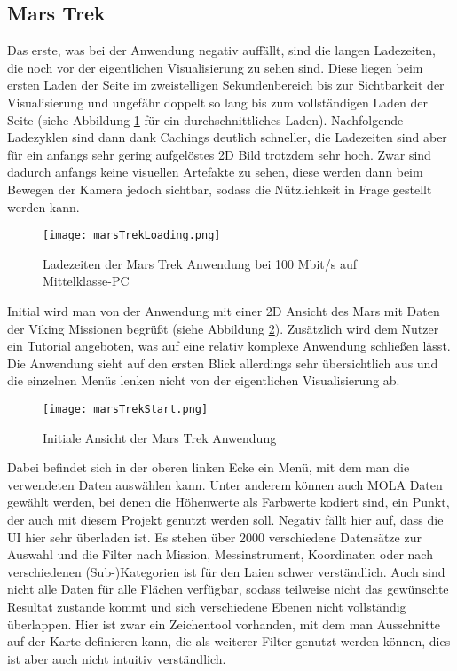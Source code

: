 \subsection{Mars Trek}\label{marsTrek}
Das erste, was bei der Anwendung negativ auffällt, sind die langen Ladezeiten, die noch vor der eigentlichen Visualisierung zu sehen sind. Diese liegen beim ersten Laden der Seite im zweistelligen Sekundenbereich bis zur Sichtbarkeit der Visualisierung und ungefähr doppelt so lang bis zum vollständigen Laden der Seite (siehe Abbildung \ref{marsTrekLoading} für ein durchschnittliches Laden). Nachfolgende Ladezyklen sind dann dank Cachings deutlich schneller, die Ladezeiten sind aber für ein anfangs sehr gering aufgelöstes 2D Bild trotzdem sehr hoch. Zwar sind dadurch anfangs keine visuellen Artefakte zu sehen, diese werden dann beim Bewegen der Kamera jedoch sichtbar, sodass die Nützlichkeit in Frage gestellt werden kann.

\begin{figure}[H]
  \texttt{[image: marsTrekLoading.png]}
  \caption{Ladezeiten der Mars Trek Anwendung bei 100 Mbit/s auf Mittelklasse-PC}
  \label{marsTrekLoading}
\end{figure}

Initial wird man von der Anwendung mit einer 2D Ansicht des Mars mit Daten der Viking Missionen begrüßt (siehe Abbildung \ref{marsTrekStart}). Zusätzlich wird dem Nutzer ein Tutorial angeboten, was auf eine relativ komplexe Anwendung schließen lässt. Die Anwendung sieht auf den ersten Blick allerdings sehr übersichtlich aus und die einzelnen Menüs lenken nicht von der eigentlichen Visualisierung ab.

\begin{figure}[H]
  \texttt{[image: marsTrekStart.png]}
  \caption{Initiale Ansicht der Mars Trek Anwendung}
  \label{marsTrekStart}
\end{figure}

Dabei befindet sich in der oberen linken Ecke ein Menü, mit dem man die verwendeten Daten auswählen kann. Unter anderem können auch MOLA Daten gewählt werden, bei denen die Höhenwerte als Farbwerte kodiert sind, ein Punkt, der auch mit diesem Projekt genutzt werden soll. Negativ fällt hier auf, dass die UI hier sehr überladen ist. Es stehen über 2000 verschiedene Datensätze zur Auswahl und die Filter nach Mission, Messinstrument, Koordinaten oder nach verschiedenen (Sub-)Kategorien ist für den Laien schwer verständlich. Auch sind nicht alle Daten für alle Flächen verfügbar, sodass teilweise nicht das gewünschte Resultat zustande kommt und sich verschiedene Ebenen nicht vollständig überlappen. Hier ist zwar ein Zeichentool vorhanden, mit dem man Ausschnitte auf der Karte definieren kann, die als weiterer Filter genutzt werden können, dies ist aber auch nicht intuitiv verständlich. 


